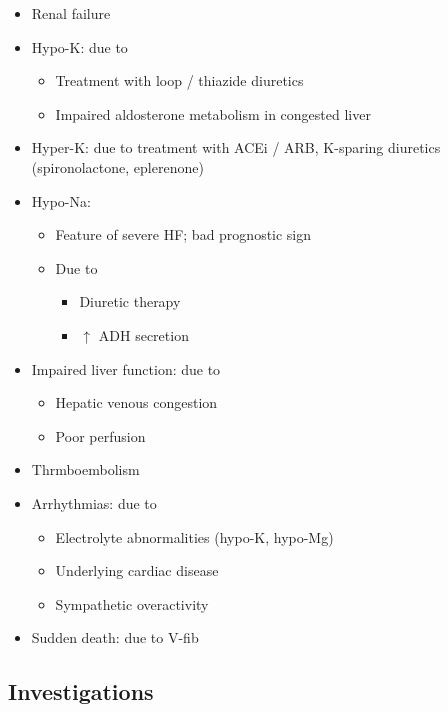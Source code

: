 \documentclass[
  12pt,
]{memoir}
\providecommand{\tightlist}{%
  \setlength{\itemsep}{0pt}\setlength{\parskip}{0pt}}
\begin{document}
\begin{itemize}
\tightlist
\item
  Renal failure
\item
  Hypo-K: due to

  \begin{itemize}
  \tightlist
  \item
    Treatment with loop / thiazide diuretics
  \item
    Impaired aldosterone metabolism in congested liver
  \end{itemize}
\item
  Hyper-K: due to treatment with ACEi / ARB, K-sparing diuretics
  (spironolactone, eplerenone)
\item
  Hypo-Na:

  \begin{itemize}
  \tightlist
  \item
    Feature of severe HF; bad prognostic sign
  \item
    Due to

    \begin{itemize}
    \tightlist
    \item
      Diuretic therapy
    \item
      \(\uparrow\) ADH secretion
    \end{itemize}
  \end{itemize}
\item
  Impaired liver function: due to

  \begin{itemize}
  \tightlist
  \item
    Hepatic venous congestion
  \item
    Poor perfusion
  \end{itemize}
\item
  Thrmboembolism
\item
  Arrhythmias: due to

  \begin{itemize}
  \tightlist
  \item
    Electrolyte abnormalities (hypo-K, hypo-Mg)
  \item
    Underlying cardiac disease
  \item
    Sympathetic overactivity
  \end{itemize}
\item
  Sudden death: due to V-fib
\end{itemize}

\hypertarget{investigations-2}{%
\subsection{Investigations}\label{investigations-2}}
\end{document}
